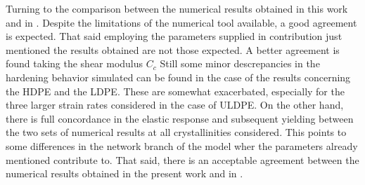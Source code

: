 Turning to the comparison between the numerical results obtained in this work and in \cite{abdul-hameedTwophaseHyperelasticviscoplasticConstitutive2014}.
Despite the limitations of the numerical tool available, a good agreement is expected.
That said employing the parameters supplied in contribution just mentioned the results obtained are not those expected.
A better agreement is found taking the shear modulus $C_c$
Still some minor descrepancies in the hardening behavior simulated can be found in the case of the results concerning the HDPE and the LDPE.
These are somewhat exacerbated, especially for the three larger strain rates considered in the case of ULDPE.
On the other hand, there is full concordance in the elastic response and subsequent yielding between the two sets of numerical results at all crystallinities considered.
This points to some differences in the network branch of the model wher the parameters already mentioned contribute to.
That said, there is an acceptable agreement between the numerical results obtained in the present work and in \cite{abdul-hameedTwophaseHyperelasticviscoplasticConstitutive2014}.

